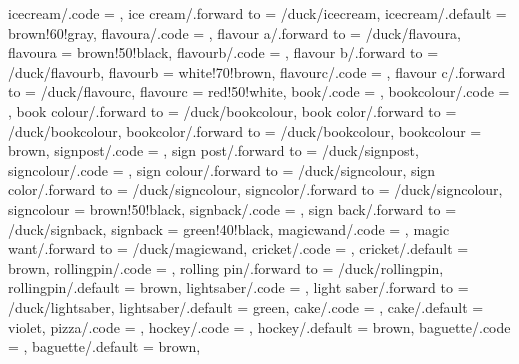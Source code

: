 {  icecream/.code            = \duck@icecreamtrue    
                              \def\duck@cone{#1},
  ice cream/.forward to     = /duck/icecream,
  icecream/.default         = brown!60!gray,
  flavoura/.code            = \def\duck@flavoura{#1},
  flavour a/.forward to     = /duck/flavoura,
  flavoura                  = brown!50!black,
  flavourb/.code            = \def\duck@flavourb{#1},
  flavour b/.forward to     = /duck/flavourb,
  flavourb                  = white!70!brown,
  flavourc/.code            = \def\duck@flavourc{#1},
  flavour c/.forward to     = /duck/flavourc,
  flavourc                  = red!50!white,
  book/.code                = \duck@booktrue        
                              \def\duck@book{#1},
  bookcolour/.code          = \def\duck@bookcolour{#1},
  book colour/.forward to   = /duck/bookcolour,
  book color/.forward to    = /duck/bookcolour,
  bookcolor/.forward to     = /duck/bookcolour,
  bookcolour                = brown,
  signpost/.code            = \duck@signposttrue    
                              \def\duck@signpost{#1},
  sign post/.forward to     = /duck/signpost,
  signcolour/.code          = \def\duck@signcolour{#1},
  sign colour/.forward to   = /duck/signcolour,
  sign color/.forward to    = /duck/signcolour,
  signcolor/.forward to     = /duck/signcolour,  
  signcolour                = brown!50!black,
  signback/.code            = \def\duck@signback{#1},
  sign back/.forward to     = /duck/signback,
  signback                  = green!40!black,
  magicwand/.code           = \duck@magicwandtrue,
  magic want/.forward to    = /duck/magicwand,
  cricket/.code             = \duck@crickettrue     
                              \def\duck@cricket{#1},
  cricket/.default          = brown,
  rollingpin/.code          = \duck@rollingpintrue  
                              \def\duck@rollingpin{#1},
  rolling pin/.forward to   = /duck/rollingpin,
  rollingpin/.default       = brown,
  lightsaber/.code          = \duck@lightsabertrue  
                              \def\duck@lightsaber{#1},
  light saber/.forward to   = /duck/lightsaber,
  lightsaber/.default       = green,
  cake/.code                = \duck@caketrue        
                              \def\duck@cake{#1},
  cake/.default             = violet,
  pizza/.code               = \duck@pizzatrue,
  hockey/.code              = \duck@hockeytrue      
                              \def\duck@hockey{#1},
  hockey/.default           = brown,
  baguette/.code            = \duck@baguettetrue    
                              \def\duck@baguette{#1},
  baguette/.default         = brown,
}

